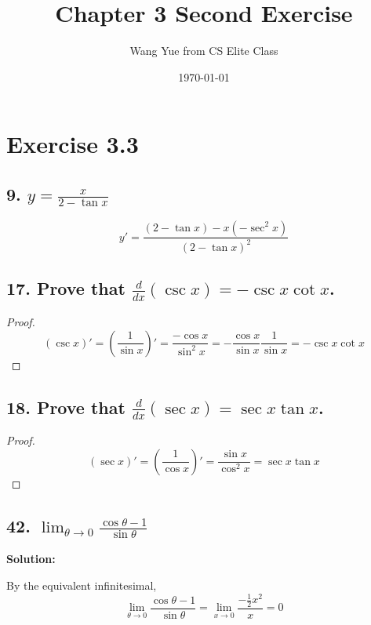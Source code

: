 \documentclass{article}
\newenvironment{solution}{
    \par \textbf{Solution: } \quad \par
}{\par}
\begin{document}
    \title{Chapter 3 Second Exercise}
    \author{Wang Yue from CS Elite Class}
    \date{\today}

    \maketitle

    \section*{Exercise 3.3}
    \subsection*{9. $y = \frac{x}{2 - \tan x}$}

    $$y' = \frac{(2 - \tan x) - x(-\sec^2 x)}{(2 - \tan x)^2}$$

    \subsection*{17. Prove that $\frac{d}{dx}(\csc x) = - \csc x \cot x$.}

    \begin{proof}
        $$(\csc x)' = (\frac{1}{\sin x})' = \frac{-\cos x}{\sin ^2 x} = -\frac{\cos x}{\sin x}\frac{1}{\sin x} = - \csc x \cot x$$

    \end{proof}

    \subsection*{18. Prove that $\frac{d}{dx}(\sec x) = \sec x \tan x$.}

    \begin{proof}
        $$(\sec x)' = (\frac{1}{\cos x})' = \frac{\sin x}{\cos ^2 x} = \sec x \tan x $$
        
    \end{proof}

    \subsection*{42. $\lim_{\theta \to 0}\frac{\cos \theta - 1}{\sin \theta}$}

    \begin{solution}
        By the equivalent infinitesimal, 
        $$\lim_{\theta \to 0}\frac{\cos \theta - 1}{\sin \theta} = \lim_{x \to 0}\frac{-\frac 1 2 x^2}{x} = 0$$
    \end{solution}
\end{document}
